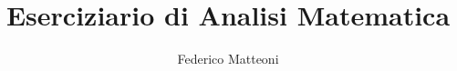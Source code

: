 \documentclass[10pt]{article}
\begin{document}
\title{Eserciziario di Analisi Matematica}
\author{Federico Matteoni}
\date{ }
\renewcommand*\contentsname{Indice}

\maketitle
\tableofcontents
\end{document}
